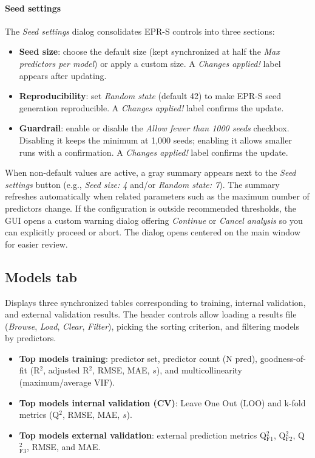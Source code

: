 \documentclass[11pt,a4paper]{article}
\begin{document}
\paragraph{Seed settings}
The \emph{Seed settings} dialog consolidates EPR-S controls into three sections:
\begin{itemize}
  \item \textbf{Seed size}: choose the default size (kept synchronized at half the \emph{Max predictors per model}) or apply a custom size. A \emph{Changes applied!} label appears after updating.
  \item \textbf{Reproducibility}: set \emph{Random state} (default 42) to make EPR-S seed generation reproducible. A \emph{Changes applied!} label confirms the update.
  \item \textbf{Guardrail}: enable or disable the \emph{Allow fewer than 1000 seeds} checkbox. Disabling it keeps the minimum at 1{,}000 seeds; enabling it allows smaller runs with a confirmation. A \emph{Changes applied!} label confirms the update.
\end{itemize}
When non-default values are active, a gray summary appears next to the \emph{Seed settings} button (e.g., \emph{Seed size: 4} and/or \emph{Random state: 7}). The summary refreshes automatically when related parameters such as the maximum number of predictors change.
If the configuration is outside recommended thresholds, the GUI opens a custom warning dialog offering \emph{Continue} or \emph{Cancel analysis} so you can explicitly proceed or abort.
The dialog opens centered on the main window for easier review.

\subsection{\textbf{Models} tab}
Displays three synchronized tables corresponding to training, internal validation, and external validation results. The header controls allow loading a results file (\emph{Browse}, \emph{Load}, \emph{Clear}, \emph{Filter}), picking the sorting criterion, and filtering models by predictors.
  \begin{itemize}
    \item \textbf{Top models training}: predictor set, predictor count (N pred), goodness-of-fit (R$^2$, adjusted R$^2$, RMSE, MAE, $s$), and multicollinearity (maximum/average VIF).
    \item \textbf{Top models internal validation (CV)}: Leave One Out (LOO) and k-fold metrics (Q$^2$, RMSE, MAE, $s$).
    \item \textbf{Top models external validation}: external prediction metrics Q$^2_{\mathrm{F1}}$, Q$^2_{\mathrm{F2}}$, Q$^2_{\mathrm{F3}}$, RMSE, and MAE.
  \end{itemize}
  
\end{document}
